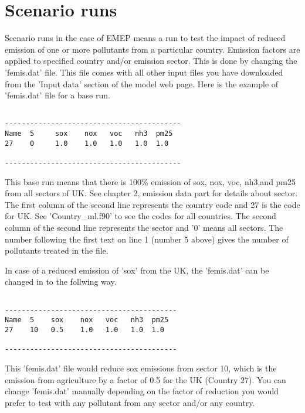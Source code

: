 \section{Scenario runs}

Scenario runs in the case of EMEP means a run to test the impact of reduced emission of
one or more pollutants from a particular country.  Emission factors
are applied to specified country and/or emission sector.  This is done by
changing the 'femis.dat' file. This file comes with all other input
files you have downloaded from the 'Input
data' section of the model web page.  Here is the example of 'femis.dat'
file for a base run. 

\begin{verbatim}

------------------------------------------
Name  5     sox    nox   voc   nh3  pm25
27    0     1.0    1.0   1.0   1.0  1.0  

------------------------------------------

\end{verbatim}

This base run means that there is 100\% emission of sox, nox, voc,
nh3,and pm25 from all sectors of UK.  See chapter 2, emission data
part for details about sector.  The first column of the second
line represents the country code and 27 is the code for UK.  See
'Country\_ml.f90' to see the codes for all countries.  The second
column of the second line 
represents the sector and '0' means all sectors.  The number following
the first text on line 1 (number 5 above) gives the number of
pollutants treated in the file.   
              

In case of a reduced emission of 'sox' from the UK, the 'femis.dat' can be
changed in to the follwing way. 

\begin{verbatim}

-----------------------------------------
Name  5    sox    nox   voc   nh3  pm25 
27    10   0.5    1.0   1.0   1.0  1.0   

-----------------------------------------

\end{verbatim}        

This 'femis.dat' file would reduce sox emissions from sector 10, which
is the emission from  agriculture by a
factor of 0.5 for the UK (Country 27).  You can change 'femis.dat'
manually depending on the factor of
reduction you would prefer to test with any pollutant from any sector
and/or any country. 

